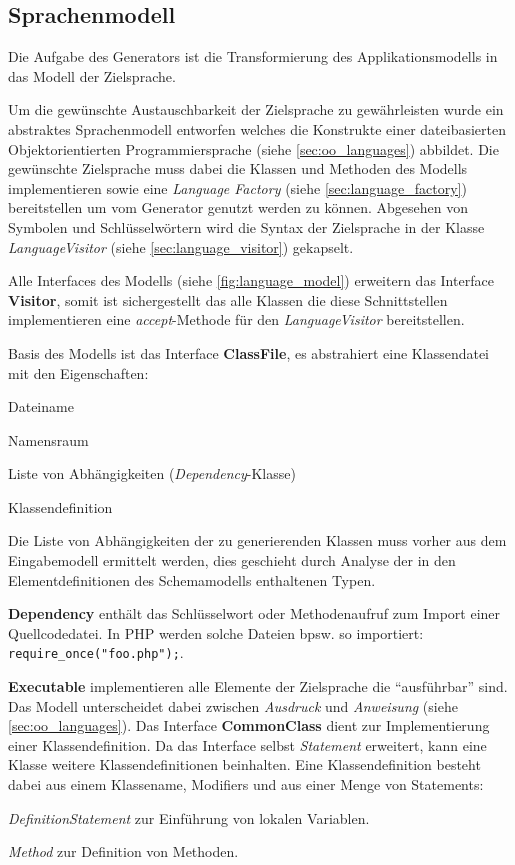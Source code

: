 \subsection{Sprachenmodell}
\label{sec:language_model}

Die Aufgabe des Generators ist die Transformierung des Applikationsmodells in das Modell der Zielsprache. 

Um die gewünschte Austauschbarkeit der Zielsprache zu gewährleisten wurde ein abstraktes Sprachenmodell entworfen welches die Konstrukte einer dateibasierten Objektorientierten Programmiersprache (siehe \cref{sec:oo_languages}) abbildet. 
Die gewünschte Zielsprache muss dabei die Klassen und Methoden des Modells implementieren sowie eine \emph{Language Factory} (siehe \cref{sec:language_factory}) bereitstellen um vom Generator genutzt werden zu können.
Abgesehen von Symbolen und Schlüsselwörtern wird die Syntax der Zielsprache in der Klasse \emph{LanguageVisitor} (siehe \cref{sec:language_visitor}) gekapselt. 

Alle Interfaces des Modells (siehe \cref{fig:language_model}) erweitern das Interface \textbf{Visitor}, somit ist sichergestellt das alle Klassen die diese Schnittstellen implementieren eine \emph{accept}-Methode für den \emph{LanguageVisitor} bereitstellen.

Basis des Modells ist das Interface \textbf{ClassFile}, es abstrahiert eine Klassendatei mit den Eigenschaften:
\begin{compactitem}
    \item Dateiname
    \item Namensraum
    \item Liste von Abhängigkeiten (\emph{Dependency}-Klasse)
    \item Klassendefinition
\end{compactitem}

Die Liste von Abhängigkeiten der zu generierenden Klassen muss vorher aus dem Eingabemodell ermittelt werden, dies geschieht durch Analyse der in den Elementdefinitionen des Schemamodells enthaltenen Typen. 

\textbf{Dependency} enthält das Schlüsselwort oder Methodenaufruf zum Import einer Quellcodedatei. In PHP werden solche Dateien bpsw. so importiert: \texttt{require\_once("foo.php");}.

\textbf{Executable} implementieren alle Elemente der Zielsprache die \enquote{ausführbar} sind. Das Modell unterscheidet dabei zwischen \emph{Ausdruck} und \emph{Anweisung} (siehe \cref{sec:oo_languages}). 
Das Interface \textbf{CommonClass} dient zur Implementierung einer Klassendefinition. Da das Interface selbst \emph{Statement} erweitert, kann eine Klasse weitere Klassendefinitionen beinhalten. Eine Klassendefinition besteht dabei aus einem Klassename, Modifiers und aus einer Menge von Statements:
\begin{compactitem}
    \item \emph{DefinitionStatement} zur Einführung von lokalen Variablen.
    \item \emph{Method} zur Definition von Methoden.
\end{compactitem}


